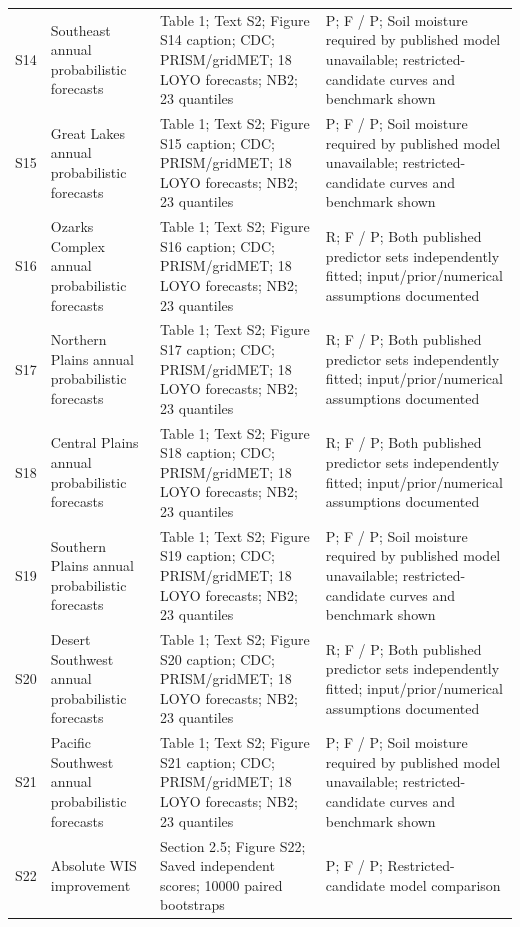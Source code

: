 \documentclass[11pt]{article}
\begin{document}
\begin{longtable}{p{}p{}p{}p{}}
S14 & Southeast annual probabilistic forecasts & Table 1; Text S2; Figure S14 caption; CDC; PRISM/gridMET; 18 LOYO forecasts; NB2; 23 quantiles & P; F / P; Soil moisture required by published model unavailable; restricted-candidate curves and benchmark shown \\
S15 & Great Lakes annual probabilistic forecasts & Table 1; Text S2; Figure S15 caption; CDC; PRISM/gridMET; 18 LOYO forecasts; NB2; 23 quantiles & P; F / P; Soil moisture required by published model unavailable; restricted-candidate curves and benchmark shown \\
S16 & Ozarks Complex annual probabilistic forecasts & Table 1; Text S2; Figure S16 caption; CDC; PRISM/gridMET; 18 LOYO forecasts; NB2; 23 quantiles & R; F / P; Both published predictor sets independently fitted; input/prior/numerical assumptions documented \\
S17 & Northern Plains annual probabilistic forecasts & Table 1; Text S2; Figure S17 caption; CDC; PRISM/gridMET; 18 LOYO forecasts; NB2; 23 quantiles & R; F / P; Both published predictor sets independently fitted; input/prior/numerical assumptions documented \\
S18 & Central Plains annual probabilistic forecasts & Table 1; Text S2; Figure S18 caption; CDC; PRISM/gridMET; 18 LOYO forecasts; NB2; 23 quantiles & R; F / P; Both published predictor sets independently fitted; input/prior/numerical assumptions documented \\
S19 & Southern Plains annual probabilistic forecasts & Table 1; Text S2; Figure S19 caption; CDC; PRISM/gridMET; 18 LOYO forecasts; NB2; 23 quantiles & P; F / P; Soil moisture required by published model unavailable; restricted-candidate curves and benchmark shown \\
S20 & Desert Southwest annual probabilistic forecasts & Table 1; Text S2; Figure S20 caption; CDC; PRISM/gridMET; 18 LOYO forecasts; NB2; 23 quantiles & R; F / P; Both published predictor sets independently fitted; input/prior/numerical assumptions documented \\
S21 & Pacific Southwest annual probabilistic forecasts & Table 1; Text S2; Figure S21 caption; CDC; PRISM/gridMET; 18 LOYO forecasts; NB2; 23 quantiles & P; F / P; Soil moisture required by published model unavailable; restricted-candidate curves and benchmark shown \\
S22 & Absolute WIS improvement & Section 2.5; Figure S22; Saved independent scores; 10000 paired bootstraps & P; F / P; Restricted-candidate model comparison \\

\end{longtable}
\end{document}
